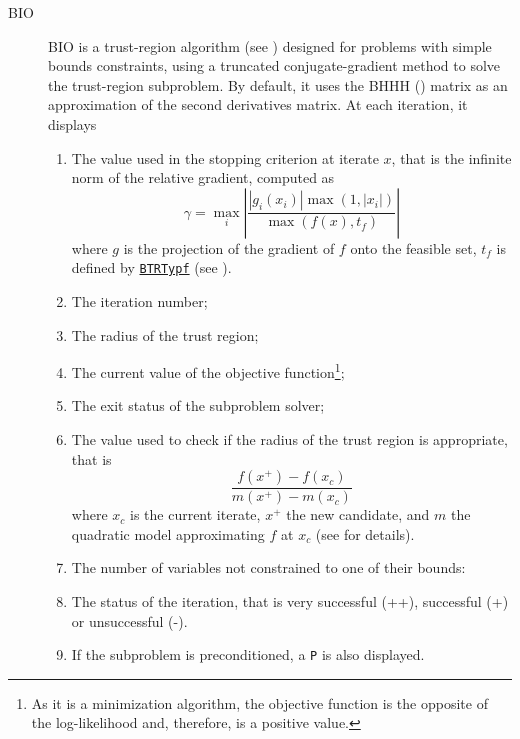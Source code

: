 \documentclass[12pt]{memoir}
\begin{document}
   \begin{description}
      \item[BIO ] 
         BIO is a trust-region algorithm (see \cite{ConnGoulToin00}) designed
         for problems with simple bounds constraints, using a
         truncated conjugate-gradient method to solve the trust-region
         subproblem. By default, it uses the BHHH (\cite{BernHallHallHaus74})
         matrix as an approximation of the second derivatives matrix.  At each
         iteration, it displays 
         \begin{enumerate}
            \item The value used in the stopping criterion at
               iterate $x$, that
               is the infinite norm of the relative gradient, computed as
               \begin{equation}
             \label{eq:gmax}
               \gamma = \max_{i} \left| \frac{|g_i(x_i)| \max(1,|x_i|) }{\max(f(x),t_f)} \right|
               \end{equation}
               where $g$ is the projection of the gradient of $f$ onto the feasible
               set, $t_f$ is defined by \hyperlink{BTRTypf}{\texttt{BTRTypf}}  
               (see \cite{DennSchn96}).
            \item The iteration number;
            \item The radius of the trust region;
            \item The current value of the objective function\footnote{As it is a
               minimization algorithm, the objective function is the opposite of
               the log-likelihood and, therefore, is a positive value.};
            \item The exit status of the subproblem solver;
            \item The value used to check if the radius of the trust region is
               appropriate, that is 
               \[
               \frac{f(x^+) - f(x_c)}{m(x^+)-m(x_c)}
               \] 
               where $x_c$ is the current iterate, $x^+$ the new candidate, and $m$
               the quadratic model approximating $f$  at $x_c$ (see
               \cite{ConnGoulToin00} for details).
            \item The number of variables not constrained to one of their bounds:
            \item The status of the iteration, that is very successful (++),
               successful (+) or unsuccessful (-).
            \item If the subproblem is preconditioned, a \verb+P+ is also displayed.
         \end{enumerate}
         

\end{description}
\end{document}
